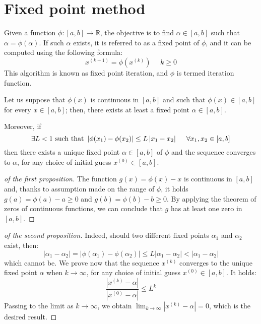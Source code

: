 \section{Fixed point method}

Given a function $\phi:[a,b] \rightarrow \mathbb{R}$, the objective is to find $\alpha \in [a,b]$ such that $\alpha=\phi(\alpha)$. 
If such $\alpha$ exists, it is referred to as a fixed point of $\phi$, and it can be computed using the following formula:
\[x^{(k+1)}=\phi(x^{(k)}) \:\:\:\:\:\: k \geq 0\]
This algorithm is known as fixed point iteration, and $\phi$ is termed iteration function.
\begin{proposition}
    Let us suppose that $\phi(x)$ is continuous in $[a,b]$ and such that $\phi(x) \in [a,b]$ for every $x \in [a,b]$; then, there exists at least a fixed point $\alpha \in [a,b]$.
        
    Moreover, if 
    \[\exists L < 1 \textnormal{ such that } \left\lvert \phi(x_1)-\phi(x_2) \right\rvert \leq L\left\lvert x_1-x_2 \right\rvert  \:\:\:\:\:\: \forall x_1,x_2\in [a,b]\]
    then there exists a unique fixed point $\alpha \in [a,b]$ of $\phi$ and the sequence converges to $\alpha$, for any choice of initial guess $x^{(0)}\in [a,b]$.
\end{proposition}
\begin{proof}[of the first proposition]
    The function $g(x)=\phi(x)-x$ is continuous in $[a,b]$ and, thanks to assumption made on the range of $\phi$, it holds $g(a)=\phi(a)-a\geq 0$ and $g(b)=\phi(b)-b\geq 0$.
    By applying the theorem of zeros of continuous functions, we can conclude that $g$ has at least one zero in $[a,b]$. 
\end{proof}
\begin{proof}[of the second proposition]
    Indeed, should two different fixed points $\alpha_1$ and $\alpha_2$ exist, then: 
    \[\left\lvert \alpha_1-\alpha_2 \right\rvert = \left\lvert \phi(\alpha_1)-\phi(\alpha_2) \right\rvert \leq L \left\lvert \alpha_1-\alpha_2 \right\rvert < 
    \left\lvert \alpha_1-\alpha_2 \right\rvert\]
    which cannot be. 
    We prove now that the sequence $x^{(k)}$ converges to the unique fixed point $\alpha$ when $k \rightarrow \infty$, for any choice of initial guess $x^{(0)} \in [a,b]$. 
    It holds: 
    \[\dfrac{\left\lvert x^{(k)}-\alpha \right\rvert}{\left\lvert x^{(0)}-\alpha \right\rvert} \leq L^k\]
    Passing to the limit as $k \rightarrow \infty$, we obtain $\lim_{k \rightarrow \infty}{\left\lvert x^{(k)}-\alpha \right\rvert}=0$, which is the desired result. 
\end{proof}

